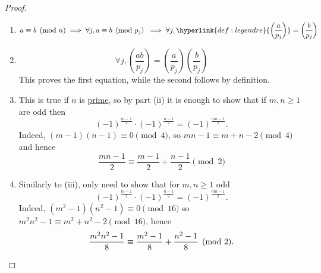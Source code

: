 \documentclass{article}
\newcommand{\legendre}[2]{\genfrac{(}{)}{}{}{#1}{#2}}
\begin{document}
\begin{proof}\leavevmode
    \begin{enumerate}[label=(\roman*)]
        \item
            \begin{equation*}
                a \equiv b \pmod{n} \implies \forall j, a \equiv b \pmod{p_j} \; \implies \forall j, \hyperlink{def:legendre}{\legendre{a}{p_j}} = \legendre{b}{p_j}
            \end{equation*}
        \item
            \begin{equation*}
                \forall j, \legendre{ab}{p_j} = \legendre{a}{p_j} \legendre{b}{p_j}
            \end{equation*}
            This proves the first equation, while the second follows by definition.
        \item This is true if $n$ is \hyperlink{def:prime}{prime}, so by part (ii) it is enough to show that if $m, n \geq 1$ are odd then
            \begin{equation*}
                (-1)^\frac{m-1}{2} \cdot (-1)^\frac{n-1}{2} = (-1)^\frac{mn-1}{2}.
            \end{equation*}
            Indeed, $(m-1)(n-1) \equiv 0 \pmod{4}$, so $mn-1 \equiv m+n-2 \pmod{4}$ and hence
            \begin{equation*}
                \frac{mn-1}{2} \equiv \frac{m-1}{2} + \frac{n-1}{2} \pmod{2}
            \end{equation*}
        \item Similarly to (iii), only need to show that for $m, n \geq 1$ odd
            \begin{equation*}
                (-1)^\frac{m-1}{2} \cdot (-1)^\frac{n-1}{2} = (-1)^\frac{mn-1}{2}.
            \end{equation*}
            Indeed, $(m^2 - 1)(n^2 - 1) \equiv 0 \pmod{16}$ so $m^2 n^2 - 1 \equiv m^2 + n^2 - 2 \pmod{16}$, hence
            \begin{equation*}
                \frac{m^2n^2-1}{8} \equiv \frac{m^2-1}{8} + \frac{n^2-1}{8} \pmod{2}. \qedhere
            \end{equation*}
    \end{enumerate}
\end{proof}

\end{document}
